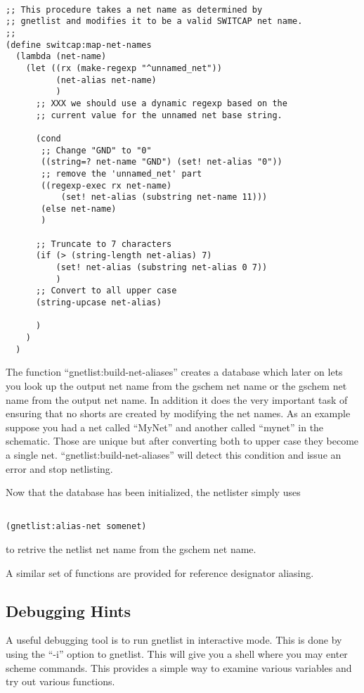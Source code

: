\documentclass{article}
\begin{document}
\begin{verbatim}

;; This procedure takes a net name as determined by
;; gnetlist and modifies it to be a valid SWITCAP net name.
;;
(define switcap:map-net-names
  (lambda (net-name)
    (let ((rx (make-regexp "^unnamed_net"))
          (net-alias net-name)
          )
      ;; XXX we should use a dynamic regexp based on the 
      ;; current value for the unnamed net base string.

      (cond 
       ;; Change "GND" to "0"
       ((string=? net-name "GND") (set! net-alias "0"))
       ;; remove the 'unnamed_net' part
       ((regexp-exec rx net-name) 
           (set! net-alias (substring net-name 11)))
       (else net-name)
       )

      ;; Truncate to 7 characters
      (if (> (string-length net-alias) 7)
          (set! net-alias (substring net-alias 0 7))
          )
      ;; Convert to all upper case
      (string-upcase net-alias)

      )
    )
  )

\end{verbatim}

The function ``gnetlist:build-net-aliases'' creates a database which
later on lets you look up the output net name from the gschem net name
or the gschem net name from the output net name.  In addition it does
the very important task of ensuring that no shorts are created by
modifying the net names.  As an example suppose you had a net called
``MyNet'' and another called ``mynet'' in the schematic.  Those are
unique but after converting both to upper case they become a single
net.  ``gnetlist:build-net-aliases'' will detect this condition and
issue an error and stop netlisting.

Now that the database has been initialized, the netlister simply uses
\begin{verbatim}

(gnetlist:alias-net somenet)

\end{verbatim}
to retrive the netlist net name from the gschem net name.

A similar set of functions are provided for reference designator
aliasing.

\subsection{Debugging Hints}
A useful debugging tool is to run gnetlist in interactive mode.  This
is done by using the ``-i'' option to gnetlist.  This will give
you a shell where you may enter scheme commands.  This provides a 
simple way to examine various variables and try out various functions.
\end{document}
